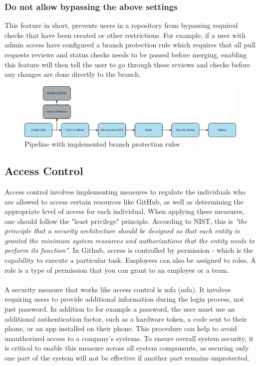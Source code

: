 \subsubsection{Do not allow bypassing the above settings}
This feature in short, prevents users in a repository from bypassing required checks that have been created or other restrictions. For example, if a user with admin access have configured a branch protection rule which requires that all pull requests reviews and status checks needs to be passed before merging, enabling this feature will then tell the user to go through these reviews and checks before any changes are done directly to the branch. 

\vspace{2mm}
\begin{figure}[H]
    \centering
    \includegraphics[width=0.8\columnwidth]{Images/pipeline6.png}
    \caption{Pipeline with implemented branch protection rules}
    \label{fig: Pipeline with implemented branch protection rules}
\end{figure}

\subsection{Access Control}
Access control involves implementing measures to regulate the individuals who are allowed to access certain resources like GitHub, as well as determining the appropriate level of access for each individual. When applying these measures, one should follow the "least privilege" principle. According to NIST, this is \textit{"the principle that a security architecture should be designed so that each entity is granted the minimum system resources and authorizations that the entity needs to perform its function"}\cite{leastprivilege}. In Github, access is controlled by permission - which is the capability to execute a particular task. Employees can also be assigned to roles. A role is a type of permission that you can grant to an employee or a team. \cite{accesscontroll}
\\~\\
A security measure that works like access control is \acrlong{mfa} (\acrshort{mfa}). It involves requiring users to provide additional information during the login process, not just password. In addition to for example a password, the user must use an additional authentication factor, such as a hardware token, a code sent to their phone, or an app installed on their phone.
This procedure can help to avoid unauthorized access to a company's systems. To ensure overall system security, it is critical to enable this measure across all system components, as securing only one part of the system will not be effective if another part remains unprotected. \cite{MFA}

